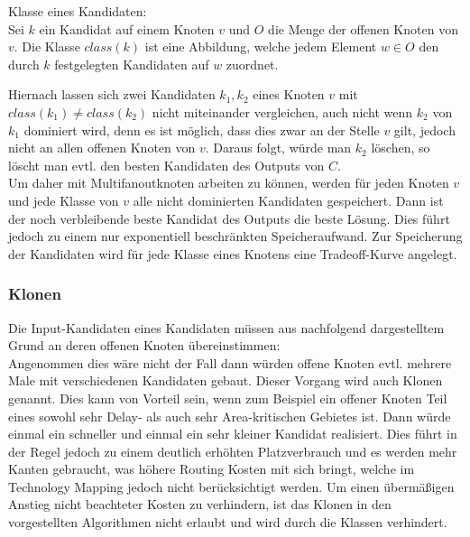 \documentclass[11pt, a4paper, german]{article}
\newcommand{\TM}{Technology  Mapping }
\begin{document}
\begin{definition}{Klasse eines Kandidaten:}\\
	Sei $k$ ein Kandidat auf einem Knoten $v$ und $O$ die Menge der offenen Knoten von $v$. Die Klasse $class(k)$ ist eine Abbildung, welche jedem Element $w \in O$ den durch $k$ festgelegten Kandidaten auf $w$ zuordnet.
\end{definition}
Hiernach lassen sich zwei Kandidaten $k_1,k_2$ eines Knoten $v$ mit $class(k_1) \neq class(k_2)$ nicht miteinander vergleichen, auch nicht wenn $k_2$ von  $k_1$ dominiert wird, denn es ist möglich, dass dies zwar an der Stelle $v$ gilt, jedoch nicht an allen offenen Knoten von $v$. Daraus folgt, würde man $k_2$ löschen, so löscht man evtl. den besten Kandidaten des Outputs von $C$. \\
Um daher mit Multifanoutknoten arbeiten zu können, werden für jeden Knoten $v$ und jede Klasse von $v$ alle nicht dominierten Kandidaten gespeichert. Dann ist der noch verbleibende beste Kandidat des Outputs die beste Lösung. Dies führt jedoch zu einem nur exponentiell beschränkten Speicheraufwand.
Zur Speicherung der Kandidaten wird für jede Klasse eines Knotens eine Tradeoff-Kurve angelegt.

\subsubsection{Klonen}\label{subsubsec:klonen}
Die Input-Kandidaten eines Kandidaten müssen aus nachfolgend dargestelltem Grund an deren offenen Knoten übereinstimmen:\\
Angenommen dies wäre nicht der Fall dann würden offene Knoten evtl. mehrere Male mit verschiedenen Kandidaten gebaut. Dieser Vorgang wird auch Klonen genannt. Dies kann von Vorteil sein, wenn zum Beispiel ein offener Knoten Teil eines sowohl sehr Delay- als auch sehr Area-kritischen Gebietes ist. Dann würde einmal ein schneller und einmal ein sehr kleiner Kandidat realisiert. Dies führt in der Regel jedoch zu einem deutlich erhöhten Platzverbrauch und es werden mehr Kanten gebraucht, was höhere Routing Kosten mit sich bringt, welche im \TM jedoch nicht berücksichtigt werden. Um einen übermäßigen Anstieg nicht beachteter Kosten zu verhindern, ist das Klonen in den vorgestellten Algorithmen nicht erlaubt und wird durch die Klassen verhindert. \\
\end{document}
